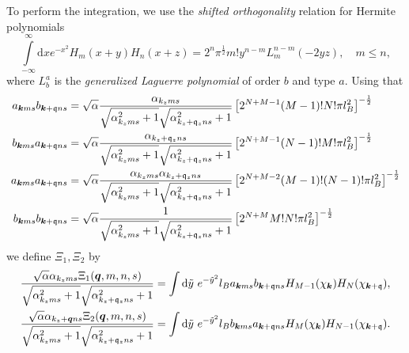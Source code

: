 To perform the integration, we use the \emph{shifted orthogonality} relation for Hermite polynomials~\cite[Eq. (7.377)]{gradshteinTableIntegralsSeries2015}
\begin{equation}
  \label{eq:hermite-shift-ortho}
  \int\limits_{-\infty }^{\infty } \mathrm{d}x
  e^{-x^2} H_m(x+y) H_n(x+z)
  = 2^n \pi^{\frac{1}{2}} m! y^{n-m} L^{n-m}_m(-2yz), \quad m\leq n,
\end{equation}
where \(L^{a}_{b}\) is the \emph{generalized Laguerre polynomial} of order \(b\) and type \(a\).
Using that
\begin{align}
  a_{\bm{k} m s} b_{\bm{k} +\mathfrak{q} ns}
  &=
    \sqrt{\alpha } \frac{\alpha_{k_z m s}}{\sqrt{\alpha_{k_z m s} ^2 + 1} \sqrt{\alpha_{k_z + \mathfrak{q}_z ns} ^2  + 1}  }
    \left[
    2^{N+M-1} (M-1)! N! \pi l_{B}^2
    \right  ]^{-\frac{1}{2}}\\
  b_{\bm{k} m s} a_{\bm{k} +\mathfrak{q} ns}
  &=
    \sqrt{\alpha } \frac{\alpha_{k_z + \mathfrak{q}_z n s}}{\sqrt{\alpha_{k_z m s} ^2 + 1} \sqrt{\alpha_{k_z + \mathfrak{q}_z ns} ^2  + 1}  }
    \left[
    2^{N+M-1} (N-1)! M! \pi l_{B}^2
    \right  ]^{-\frac{1}{2}}\\
  a_{\bm{k} m s} a_{\bm{k} +\mathfrak{q} ns}
  &=
    \sqrt{\alpha } \frac{\alpha_{k_z m s} \alpha_{k_z + \mathfrak{q}_z n s}}{
    \sqrt{\alpha_{k_z m s} ^2 + 1} \sqrt{\alpha_{k_z + \mathfrak{q}_z ns} ^2  + 1}
    }
    \left[
    2^{N+M-2} (M-1)! (N-1)! \pi l_{B}^2
    \right  ]^{-\frac{1}{2}}\\
  b_{\bm{k} m s} b_{\bm{k} +\mathfrak{q} ns}
  &=
    \sqrt{\alpha } \frac{1}{
    \sqrt{\alpha_{k_z m s} ^2 + 1} \sqrt{\alpha_{k_z + \mathfrak{q}_z ns} ^2  + 1}
    }
    \left[
    2^{N+M} M! N! \pi l_{B}^2
    \right  ]^{-\frac{1}{2}}
\end{align}
we define \( \Xi_1, \Xi_2 \) by
\begin{align}
  \label{eq:81}
  \frac{ \sqrt{\alpha } \alpha_{k_z m s} \Xi_1 ( \bm{q}, m, n, s )}{
    \sqrt{\alpha_{k_z m s}^2 + 1}
    \sqrt{\alpha_{k_z + \mathfrak{q}_z n s} ^2 + 1}
  }
  &=
  \int \mathrm{d} \tilde{y}
  ~e^{-\tilde{y}^2}
  l_{B}
  a_{\bm{k} m s} b_{\bm{k} + \mathfrak{q} ns}
  H_{M-1} (\chi_{\bm{k}})
  H_N ( \chi _{\bm{k} + \mathfrak{q}} ),\\
  \label{eq:82}
  \frac{ \sqrt{\alpha } \alpha_{k_z + \bm{q} n s} \Xi_2 ( \bm{q}, m, n, s )}{
    \sqrt{\alpha_{k_z m s}^2 + 1}
    \sqrt{\alpha_{k_z + \mathfrak{q}_z n s} ^2 + 1}
  }
  &=
  \int \mathrm{d} \tilde{y}
  ~e^{-\tilde{y}^2}
  l_{B}
  b_{\bm{k} m s} a_{\bm{k} + \mathfrak{q} ns}
  H_{M} (\chi_{\bm{k}})
  H_{N-1} ( \chi _{\bm{k} + \mathfrak{q}} ).
\end{align}
